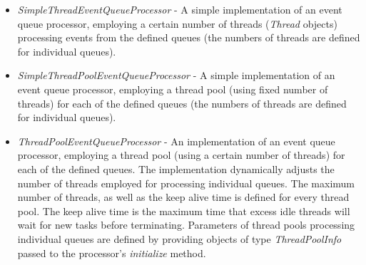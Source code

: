 \begin{itemize}
	\renewcommand{\labelitemi}{$\bullet$}
	
	\item \emph{SimpleThreadEventQueueProcessor} - A simple implementation of an event queue processor, employing a certain number of threads (\emph{Thread} objects) processing events from the defined queues (the numbers of threads are defined for individual queues).
	
	\item \emph{SimpleThreadPoolEventQueueProcessor} - A simple implementation of an event queue processor, employing a thread pool (using fixed number of threads) for each of the defined queues (the numbers of threads are defined for individual queues).
	
	\item \emph{ThreadPoolEventQueueProcessor} - An implementation of an event queue processor, employing a thread pool (using a certain number of threads) for each of the defined queues. The implementation dynamically adjusts the number of threads employed for processing individual queues. The maximum number of threads, as well as the keep alive time is defined for every thread pool. The keep alive time is the maximum time that excess idle threads will wait for new tasks before terminating. Parameters of thread pools processing individual queues are defined by providing objects of type \emph{ThreadPoolInfo} passed to the processor's \emph{initialize} method.
	

\end{itemize}
